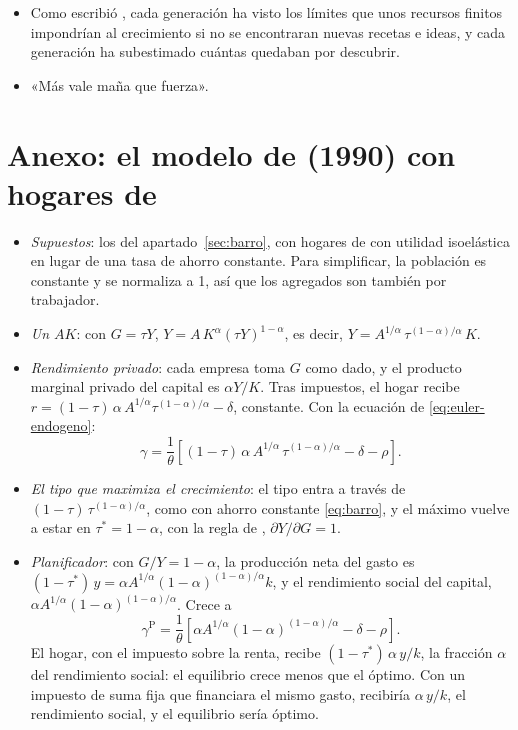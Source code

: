 \documentclass[11pt]{article}
\begin{document}
\begin{itemize}
\begin{itemize}
  \item Como escribió \textcite{Romer2008Econlib}, cada generación ha visto los límites que unos recursos finitos impondrían al crecimiento si no se encontraran nuevas recetas e ideas, y cada generación ha subestimado cuántas quedaban por descubrir.

  \item «Más vale maña que fuerza».
  \end{itemize}
\end{itemize}

\clearpage
\appendix

\section{Anexo: el modelo de  (1990) con hogares de }\label{anexo:ak-barro}

\begin{itemize}
\item \emph{Supuestos}: los del apartado~\ref{sec:barro}, con hogares de  con utilidad isoelástica en lugar de una tasa de ahorro constante. Para simplificar, la población es constante y se normaliza a 1, así que los agregados son también por trabajador.
\item \emph{Un $AK$}: con $G=\tau Y$, $Y=A\,K^{\alpha}(\tau Y)^{1-\alpha}$, es decir, $Y=A^{1/\alpha}\,\tau^{(1-\alpha)/\alpha}\,K$.
\item \emph{Rendimiento privado}: cada empresa toma $G$ como dado, y el producto marginal privado del capital es $\alpha Y/K$. Tras impuestos, el hogar recibe $r=(1-\tau)\,\alpha\,A^{1/\alpha}\tau^{(1-\alpha)/\alpha}-\delta$, constante. Con la ecuación de  \eqref{eq:euler-endogeno}:
  \[\gamma=\frac{1}{\theta}\left[(1-\tau)\,\alpha\,A^{1/\alpha}\,\tau^{(1-\alpha)/\alpha}-\delta-\rho\right].\]
\item \emph{El tipo que maximiza el crecimiento}: el tipo entra a través de $(1-\tau)\,\tau^{(1-\alpha)/\alpha}$, como con ahorro constante \eqref{eq:barro}, y el máximo vuelve a estar en $\tau^*=1-\alpha$, con la regla de , $\partial Y/\partial G=1$. \findemo
\item \emph{Planificador}: con $G/Y=1-\alpha$, la producción neta del gasto es $(1-\tau^*)\,y=\alpha A^{1/\alpha}(1-\alpha)^{(1-\alpha)/\alpha}k$, y el rendimiento social del capital, $\alpha A^{1/\alpha}(1-\alpha)^{(1-\alpha)/\alpha}$. Crece a
  \[\gamma^{\mathrm P}=\frac{1}{\theta}\left[\alpha A^{1/\alpha}(1-\alpha)^{(1-\alpha)/\alpha}-\delta-\rho\right].\]
  El hogar, con el impuesto sobre la renta, recibe $(1-\tau^*)\,\alpha\,y/k$, la fracción $\alpha$ del rendimiento social: el equilibrio crece menos que el óptimo. Con un impuesto de suma fija que financiara el mismo gasto, recibiría $\alpha\,y/k$, el rendimiento social, y el equilibrio sería óptimo\nocite{BarroSalaiMartin2004}. \findemo
\end{itemize}
\end{document}
